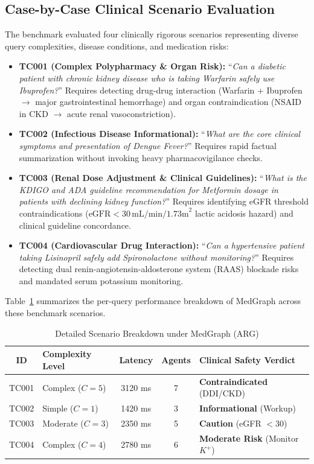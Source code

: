 \documentclass[conference]{IEEEtran}
\begin{document}
\subsection{Case-by-Case Clinical Scenario Evaluation}

The benchmark evaluated four clinically rigorous scenarios representing diverse query complexities, disease conditions, and medication risks:
\begin{itemize}
    \item \textbf{TC001 (Complex Polypharmacy \& Organ Risk):} ``\textit{Can a diabetic patient with chronic kidney disease who is taking Warfarin safely use Ibuprofen?}'' Requires detecting drug-drug interaction (Warfarin + Ibuprofen $\rightarrow$ major gastrointestinal hemorrhage) and organ contraindication (NSAID in CKD $\rightarrow$ acute renal vasoconstriction).
    \item \textbf{TC002 (Infectious Disease Informational):} ``\textit{What are the core clinical symptoms and presentation of Dengue Fever?}'' Requires rapid factual summarization without invoking heavy pharmacovigilance checks.
    \item \textbf{TC003 (Renal Dose Adjustment \& Clinical Guidelines):} ``\textit{What is the KDIGO and ADA guideline recommendation for Metformin dosage in patients with declining kidney function?}'' Requires identifying eGFR threshold contraindications ($\text{eGFR} < 30\,\text{mL/min/1.73m}^2$ lactic acidosis hazard) and clinical guideline concordance.
    \item \textbf{TC004 (Cardiovascular Drug Interaction):} ``\textit{Can a hypertensive patient taking Lisinopril safely add Spironolactone without monitoring?}'' Requires detecting dual renin-angiotensin-aldosterone system (RAAS) blockade risks and mandated serum potassium monitoring.
\end{itemize}

Table~\ref{tab:case_breakdown} summarizes the per-query performance breakdown of MedGraph across these benchmark scenarios.

\begin{table}[htbp]
\centering
\caption{Detailed Scenario Breakdown under MedGraph (ARG)}
\label{tab:case_breakdown}
\renewcommand{\arraystretch}{1.25}
\footnotesize
\setlength{\tabcolsep}{3pt}
\begin{tabular}{|c|l|c|c|l|}
\hline
\textbf{ID} & \textbf{Complexity Level} & \textbf{Latency} & \textbf{Agents} & \textbf{Clinical Safety Verdict} \\ \hline
TC001 & Complex ($C=5$) & 3120 ms & 7 & \textbf{Contraindicated} (DDI/CKD) \\ \hline
TC002 & Simple ($C=1$) & 1420 ms & 3 & \textbf{Informational} (Workup) \\ \hline
TC003 & Moderate ($C=3$) & 2350 ms & 5 & \textbf{Caution} (eGFR $< 30$) \\ \hline
TC004 & Complex ($C=4$) & 2780 ms & 6 & \textbf{Moderate Risk} (Monitor $K^+$) \\ \hline
\end{tabular}
\end{table}
\end{document}
